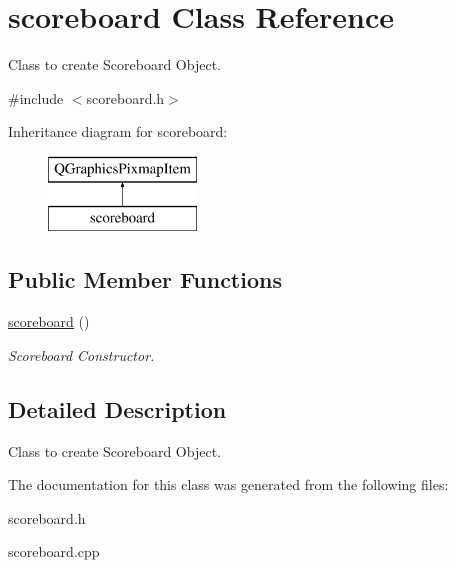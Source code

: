 \hypertarget{classscoreboard}{}\section{scoreboard Class Reference}
\label{classscoreboard}


Class to create Scoreboard Object.  




{\ttfamily \#include $<$scoreboard.\+h$>$}

Inheritance diagram for scoreboard\+:\begin{figure}[H]
\begin{center}
\leavevmode
\includegraphics[height=2.000000cm]{classscoreboard}
\end{center}
\end{figure}
\subsection*{Public Member Functions}
\begin{DoxyCompactItemize}
\item 
\mbox{\label{classscoreboard_a7e4efcdab636a3b259061e93d5f42b23}} 
\hyperlink{classscoreboard_a7e4efcdab636a3b259061e93d5f42b23}{scoreboard} ()
\begin{DoxyCompactList}\small\item\em Scoreboard Constructor. \end{DoxyCompactList}\end{DoxyCompactItemize}


\subsection{Detailed Description}
Class to create Scoreboard Object. 

The documentation for this class was generated from the following files\+:\begin{DoxyCompactItemize}
\item 
scoreboard.\+h\item 
scoreboard.\+cpp\end{DoxyCompactItemize}
